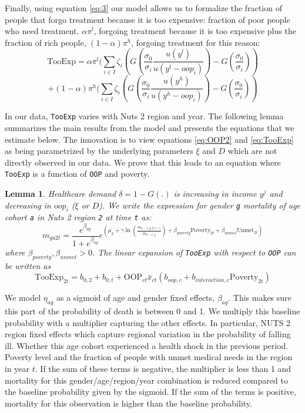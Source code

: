 \documentclass[a4paper,12pt]{article}
\newtheorem{lemma}{Lemma}
\begin{document}
Finally, using equation \eqref{eq:3} our model allows us to formalize the fraction of people that forgo treatment because it is too expensive: fraction of poor people who need treatment, \(\alpha \pi^l\), forgoing treatment because it is too expensive plus the fraction of rich people, \((1-\alpha)\pi^h\), forgoing treatment for this reason:
\begin{equation}
\label{eq:TooExp}
\text{TooExp} = \alpha \pi^l (\sum_{i \in I}\zeta_{i} \left(G\left( \frac{\sigma_0}{\sigma_i} \frac{u(y^{l})}{u(y^{l}-oop_{i})} \right) - G\left( \frac{\sigma_0}{\sigma_i} \right) \right )
\end{equation}
\begin{equation*}
 + (1-\alpha) \pi^h (\sum_{i \in I}\zeta_{i} \left(G\left( \frac{\sigma_0}{\sigma_i} \frac{u(y^{h})}{u(y^{h}-oop_{i})} \right) - G\left( \frac{\sigma_0}{\sigma_i} \right) \right )
\end{equation*}

In our data, \texttt{TooExp} varies with Nuts 2 region and year. The following lemma summarizes the main results from the model and presents the equations that we estimate below. The innovation is to view equations \eqref{eq:OOP2} and \eqref{eq:TooExp} as being parametrized by the underlying parameters \(\xi\) and \(D\) which are not directly observed in our data. We prove that this leads to an equation where \texttt{TooExp} is a function of \texttt{OOP} and poverty.

\begin{lemma}
Healthcare demand \(\delta = 1-G(.)\) is increasing in income \(y^j\) and decreasing in \(oop_i\) (\(\xi\) or \(D\)). We write the expression for gender \texttt{g} mortality of age cohort \texttt{a} in Nuts 2 region \texttt{2} at time \texttt{t} as:
$$
m_{ga2t} = \frac{e^{\beta_{ag}}}{1+e^{\beta_{ag}}} e^{\left( \mu_2 + \gamma \ln \left(\frac{m_{a-1,g,2,t-1}}{\bar{m}_{a-1,g}}\right)+ \beta_{poverty}\text{Poverty}_{2t} + \beta_{unmet}\text{Unmet}_{2t}\right)}
$$
where \(\beta_{poverty}, \beta_{unmet} > 0\). The linear expansion of \texttt{TooExp} with respect to \texttt{OOP} can be written as
$$
\text{TooExp}_{2t} = b_{0,2} + b_{0,t} + \text{OOP}_{ct} \bar{x}_{ct} \left(  b_{oop,c} + b_{interaction,c} \text{Poverty}_{2t} \right)
$$
\label{prop:1}
\end{lemma}

We model \({\eta}_{ag}\) as a sigmoid of age and gender fixed effects, \(\beta_{ag}\). This makes sure this part of the probability of death is between 0 and 1. We multiply this baseline probability with a multiplier capturing the other effects. In particular, NUTS 2 region fixed effects which capture regional variation in the probability of falling ill. Whether this age cohort experienced a health shock in the previous period. Poverty level and the fraction of people with unmet medical needs in the region in year \(t\). If the sum of these terms is negative, the multiplier is less than 1 and mortality for this gender/age/region/year combination is reduced compared to the baseline probability given by the sigmoid. If the sum of the terms is positive, mortality for this observation is higher than the baseline probability.
\end{document}
